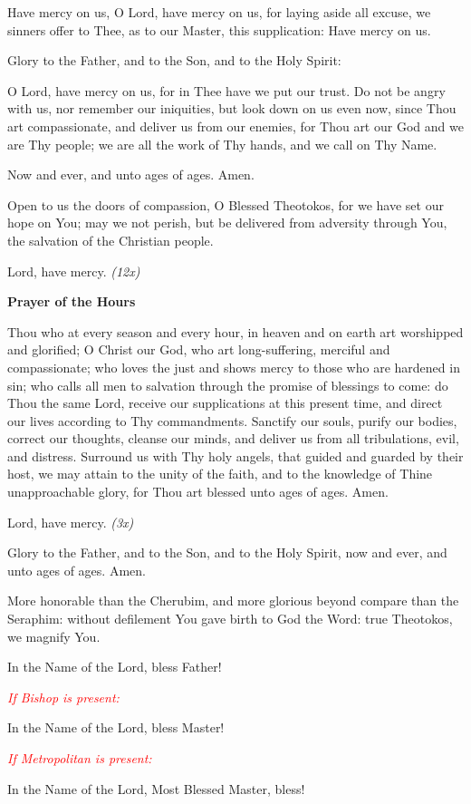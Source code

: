 \documentclass[paper=a6,fontsize=2.3mm]{scrartcl}
\begin{document}
\noindent\makebox[10mm][l]{}
\begin{minipage}[t]{\dimexpr \textwidth-10mm}
Have mercy on us, O Lord, have mercy on us, for laying aside all excuse, we sinners offer to Thee, as to our Master, this supplication: Have mercy on us.

Glory to the Father, and to the Son, and to the Holy Spirit:

O Lord, have mercy on us, for in Thee have we put our trust.  Do not be angry with us, nor remember our iniquities, but look down on us even now, since Thou art compassionate, and deliver us from our enemies, for Thou art our God and we are Thy people; we are all the work of Thy hands, and we call on Thy Name.

Now and ever, and unto ages of ages.  Amen.

Open to us the doors of compassion, O Blessed Theotokos, for we have set our hope on You; may we not perish, but be delivered from adversity through You, the salvation of the Christian people.

Lord, have mercy. \textit{(12x)}
\end{minipage}

\newpage
\begin{center}
\textbf{Prayer of the Hours}
\end{center}

\noindent{}
\begin{minipage}[t]{\dimexpr \textwidth-10mm}
Thou who at every season and every hour, in heaven and on earth art worshipped and glorified; O Christ our God, who art long-suffering, merciful and compassionate; who loves the just and shows mercy to those who are hardened in sin; who calls all men to salvation through the promise of blessings to come: do Thou the same Lord, receive our supplications at this present time, and direct our lives according to Thy commandments. Sanctify our souls,  purify our bodies, correct our thoughts, cleanse our minds, and deliver us from all tribulations, evil, and distress. Surround us with Thy holy angels, that guided and guarded by their host, we may attain to the unity of the faith, and to the knowledge of Thine unapproachable glory, for Thou art blessed unto ages of ages. Amen.

Lord, have mercy. \textit{(3x)}

Glory to the Father, and to the Son, and to the Holy Spirit, now and ever, and unto ages of ages.  Amen.

More honorable than the Cherubim, and more glorious beyond compare than the Seraphim: without defilement You gave birth to God the Word: true Theotokos, we magnify You.

In the Name of the Lord, bless Father!

\textcolor{red}{\textit{If Bishop is present:}}

In the Name of the Lord, bless Master!

\textcolor{red}{\textit{If Metropolitan is present:}}

In the Name of the Lord, Most Blessed Master, bless!
\end{minipage}
\end{document}
